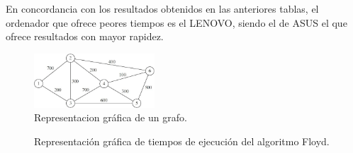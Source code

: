 \documentclass{homework}
\begin{document}
    En concordancia con los resultados obtenidos en las anteriores tablas, el ordenador que ofrece peores
    tiempos es el LENOVO, siendo el de ASUS el que ofrece resultados con mayor rapidez. 

    \begin{figure}[H]
        \centering
        \includegraphics[width=0.4\textwidth]{img/graf-floyd.jpeg}
        \caption{Representacion gráfica de un grafo.}
    \end{figure}

    \begin{figure}[H]
        \centering


        \caption{Representación gráfica de tiempos de ejecución del algoritmo Floyd.}

        \label{emp:floyd}
    \end{figure}
\end{document}

